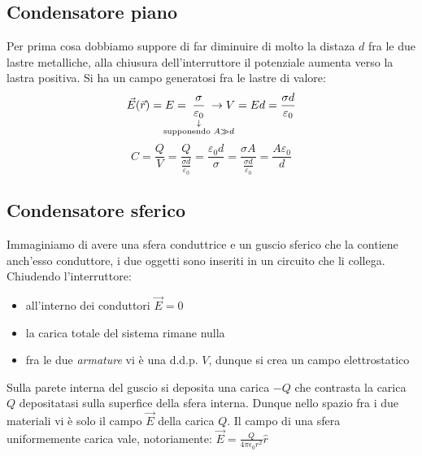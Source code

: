 \documentclass{book}
\begin{document}
\subsection{Condensatore piano}
Per prima cosa dobbiamo suppore di far diminuire di molto la distaza $d$ fra le due lastre metalliche, alla chiusura dell'interruttore il potenziale aumenta verso la lastra positiva.
Si ha un campo generatosi fra le lastre di valore:
\[
\displaystyle \vec{E}(\vec{r})=E = \hspace{- 0.8cm}\underset{\substack{\downarrow \\ \text{supponendo } A \gg d}}{\frac{\sigma}{\varepsilon_0}} \hspace{- 0.8cm} \rightarrow V=Ed=\frac{\sigma d}{\varepsilon_0}
\]
\[
C=\frac{Q}{V}=\frac{Q}{\frac{\sigma d}{\varepsilon_0}}=\frac{\varepsilon_0 d}{\sigma}=\frac{\sigma A}{\frac{\sigma d }{\varepsilon_0}}=\frac{A \varepsilon_0}{d}
\]
\begin{center}
\end{center}
\subsection{Condensatore sferico}
Immaginiamo di avere una sfera conduttrice e un guscio sferico che la contiene anch'esso conduttore, i due oggetti sono inseriti in un circuito che li collega.
Chiudendo l'interruttore:
\begin{itemize}
  \item all'interno dei conduttori $\vec{E}=0$
  \item la carica totale del sistema rimane nulla
  \item fra le due \textit{armature} vi è una d.d.p. $V$, dunque si crea un campo elettrostatico 
\end{itemize}
Sulla parete interna del guscio si deposita una carica $-Q$ che contrasta la carica $Q$ depositatasi sulla superfice della sfera interna. 
Dunque nello spazio fra i due materiali vi è solo il campo $\vec{E}$ della carica $Q$. Il campo di una sfera uniformemente carica vale, notoriamente: $\vec{E}= \frac{Q}{4\pi \epsilon_0 r^2}\hat{r}$
\end{document}
